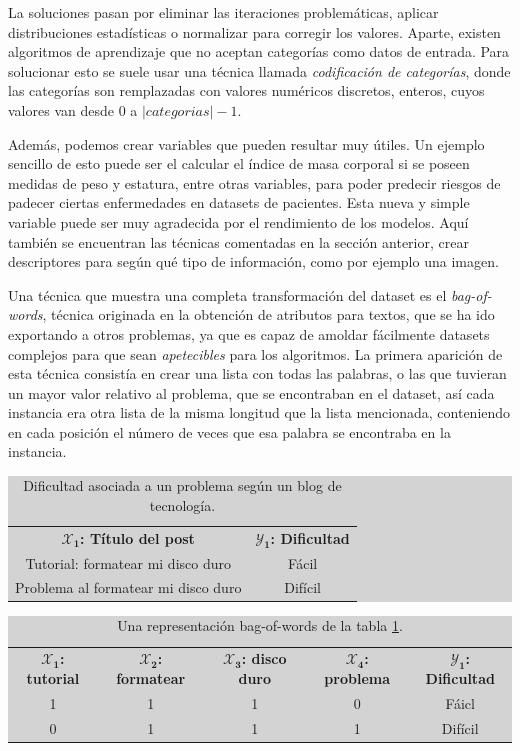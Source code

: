 La soluciones pasan por eliminar las iteraciones problemáticas, aplicar distribuciones estadísticas o normalizar para corregir los valores. Aparte, existen algoritmos de aprendizaje que no aceptan categorías como datos de entrada. Para solucionar esto se suele usar una técnica llamada \emph{codificación de categorías}, donde las categorías son remplazadas con valores numéricos discretos, enteros, cuyos valores van desde $0$ a $|categorias| - 1$.

Además, podemos crear variables que pueden resultar muy útiles. Un ejemplo sencillo de esto puede ser el calcular el índice de masa corporal si se poseen medidas de peso y estatura, entre otras variables, para poder predecir riesgos de padecer ciertas enfermedades en datasets de pacientes. Esta nueva y simple variable puede ser muy agradecida por el rendimiento de los modelos. Aquí también se encuentran las técnicas comentadas en la sección anterior, crear descriptores para según qué tipo de información, como por ejemplo una imagen.

Una técnica que muestra una completa transformación del dataset es el \emph{bag-of-words}, técnica originada en la obtención de atributos para textos, que se ha ido exportando a otros problemas, ya que es capaz de amoldar fácilmente datasets complejos para que sean \emph{apetecibles} para los algoritmos. La primera aparición de esta técnica consistía en crear una lista con todas las palabras, o las que tuvieran un mayor valor relativo al problema, que se encontraban en el dataset, así cada instancia era otra lista de la misma longitud que la lista mencionada, conteniendo en cada posición el número de veces que esa palabra se encontraba en la instancia. 

\begin{table}[ht]
\centering
\colorbox{lightgray}{\begin{tabular}{c | c} 
  $\mathbf{\mathcal{X}_{1}}$\textbf{: Título del post} & $\mathbf{\mathcal{Y}_{1}}$\textbf{: Dificultad} \\
  Tutorial: formatear mi disco duro & Fácil \\
  Problema al formatear mi disco duro & Difícil
\end{tabular}}
\caption{Dificultad asociada a un problema según un blog de tecnología.}
\label{table:2.2}
\end{table}

\begin{table}[ht]
\centering
\colorbox{lightgray}{\begin{tabular}{*{4}{c} | c} 
  $\mathbf{\mathcal{X}_{1}}$\textbf{: tutorial} & $\mathbf{\mathcal{X}_{2}}$\textbf{: formatear} & $\mathbf{\mathcal{X}_{3}}$\textbf{: disco duro} & $\mathbf{\mathcal{X}_{4}}$\textbf{: problema} & $\mathbf{\mathcal{Y}_{1}}$\textbf{: Dificultad} \\
  1 & 1 & 1 & 0 & Fáicl \\
  0 & 1 & 1 & 1 & Difícil
\end{tabular}}
\caption{Una representación bag-of-words de la tabla \ref{table:2.2}.}
\label{table:2.3}
\end{table}

